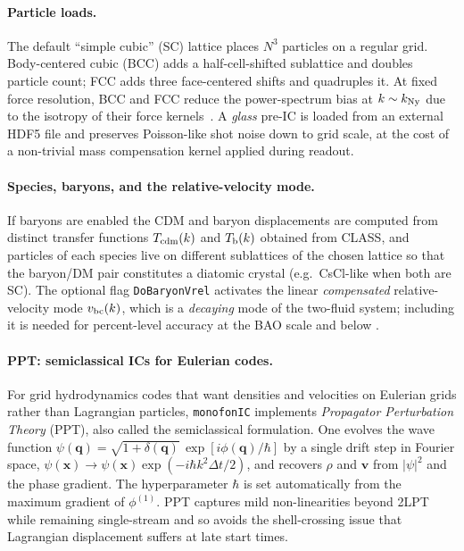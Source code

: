 \documentclass[12pt]{article}
\newcommand{\bq}{\mathbf{q}}
\newcommand{\bx}{\mathbf{x}}
\begin{document}
\paragraph{Particle loads.}  The default ``simple cubic'' (SC) lattice
places $N^3$ particles on a regular grid.  Body-centered cubic (BCC)
adds a half-cell-shifted sublattice and doubles particle count; FCC
adds three face-centered shifts and quadruples it.  At fixed force
resolution, BCC and FCC reduce the power-spectrum bias at
$k \sim k_{\rm Ny}$ due to the isotropy of their force
kernels~\citep{Garrison2016,Michaux2020}.  A \emph{glass} pre-IC is
loaded from an external HDF5 file and preserves Poisson-like shot
noise down to grid scale, at the cost of a non-trivial mass
compensation kernel applied during readout.

\paragraph{Species, baryons, and the relative-velocity mode.}
If baryons are enabled the CDM and baryon displacements are computed
from distinct transfer functions $T_{\rm cdm}(k)$ and $T_{\rm b}(k)$
obtained from CLASS, and particles of each species live on different
sublattices of the chosen lattice so that the baryon/DM pair
constitutes a diatomic crystal (e.g.\ CsCl-like when both are SC).
The optional flag \texttt{DoBaryonVrel} activates the linear
\emph{compensated} relative-velocity mode $v_{\rm bc}(k)$, which is a
\emph{decaying} mode of the two-fluid system; including it is needed
for percent-level accuracy at the BAO scale and below
\citep{HahnRampfUhlemann2021}.

\paragraph{PPT: semiclassical ICs for Eulerian codes.}
For grid hydrodynamics codes that want densities and velocities on
Eulerian grids rather than Lagrangian particles, \texttt{monofonIC}
implements \emph{Propagator Perturbation Theory} (PPT), also called
the semiclassical formulation.  One evolves the wave function
$\psi(\bq) = \sqrt{1+\delta(\bq)}\,\exp[i\phi(\bq)/\hbar]$ by a single
drift step in Fourier space,
$\psi(\bx) \to \psi(\bx) \exp(-i\hbar k^2\Delta t/2)$, and recovers
$\rho$ and $\mathbf{v}$ from $|\psi|^2$ and the phase gradient.  The
hyperparameter $\hbar$ is set automatically from the maximum gradient
of $\phi^{(1)}$.  PPT captures mild non-linearities beyond 2LPT while
remaining single-stream and so avoids the shell-crossing issue that
Lagrangian displacement suffers at late start times.
\end{document}

